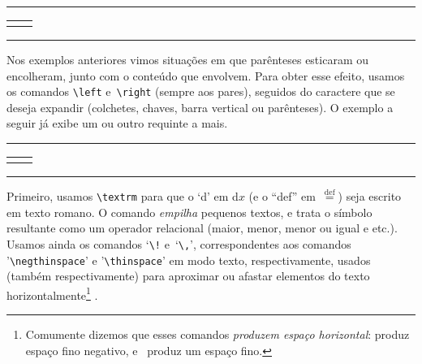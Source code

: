 \medskip
\begin{center}\hrule\smallskip
\begin{tabular}{c|c}
\begin{minipage}{.405\textwidth}\footnotesize

\end{minipage} &
\begin{minipage}{.535\textwidth}\setlength{\parindent}{1pc}

\end{minipage}
\end{tabular}
\smallskip\hrule
\end{center}
\medskip

Nos exemplos anteriores vimos situações em que parênteses esticaram ou
encolheram, junto com o conteúdo que envolvem. Para obter esse efeito,
usamos os comandos \verb'\left' e~\verb'\right' (sempre aos pares),
seguidos do caractere que se deseja expandir (colchetes, chaves, barra
vertical ou parênteses). O exemplo a seguir já exibe um ou outro
requinte a mais. 

\medskip
\begin{center}\hrule\smallskip
\begin{tabular}{c|c}
\begin{minipage}{.405\textwidth}\footnotesize

\end{minipage} &
\begin{minipage}{.535\textwidth}\setlength{\parindent}{1pc}

\end{minipage}
\end{tabular}
\smallskip\hrule
\end{center}
\medskip

Primeiro, usamos \verb'\textrm' para que o `d' em d$x$ (e o ``def''
em~$\stackrel{\textrm{def}}=$) seja escrito 
em texto romano. O comando  \emph{empilha}
pequenos textos, e trata o símbolo resultante como um operador
relacional (maior, menor, menor ou igual e etc.). Usamos ainda os
comandos `\verb'\!' e~`\verb'\,'', correspondentes aos comandos
'\verb'\negthinspace'' e '\verb'\thinspace'' em modo texto,
respectivamente, usados (também respectivamente) para aproximar ou
afastar elementos do texto horizontalmente\footnote{Comumente dizemos
  que esses comandos   \emph{produzem espaço horizontal}:
   produz   espaço fino negativo,
  e~ produz um espaço fino.} %
.

